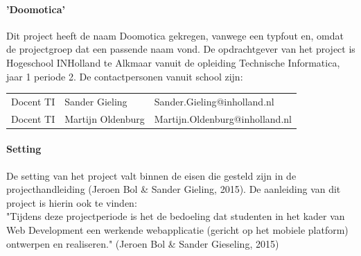 \documentclass[11pt]{article}
\begin{document}
\paragraph{'Doomotica'}
\begin{flushleft}
	 Dit project heeft de naam Doomotica gekregen, vanwege een typfout en, omdat de projectgroep dat een passende naam vond. 
	De opdrachtgever van het project is Hogeschool INHolland te Alkmaar vanuit de opleiding Technische Informatica, 
	jaar 1 periode 2. De contactpersonen vanuit school zijn:\\
	\begin{tabular}{l l l}
		Docent TI & Sander Gieling & Sander.Gieling@inholland.nl\\
		Docent TI & Martijn Oldenburg & Martijn.Oldenburg@inholland.nl\\
		\end{tabular}
	\end{flushleft}

\paragraph{Setting}
\begin{flushleft}
	De setting van het project valt binnen de eisen die gesteld zijn in de projecthandleiding (Jeroen Bol \& Sander Gieling, 2015). De aanleiding van dit project is hierin ook te vinden: \\
	"Tijdens  deze  projectperiode  is  het  de  bedoeling  dat  studenten  in  het  kader  van
	Web	Development een werkende webapplicatie (gericht op het mobiele platform) ontwerpen
	en  realiseren." (Jeroen Bol \& Sander Gieseling, 2015)
\end{flushleft}
\end{document}
